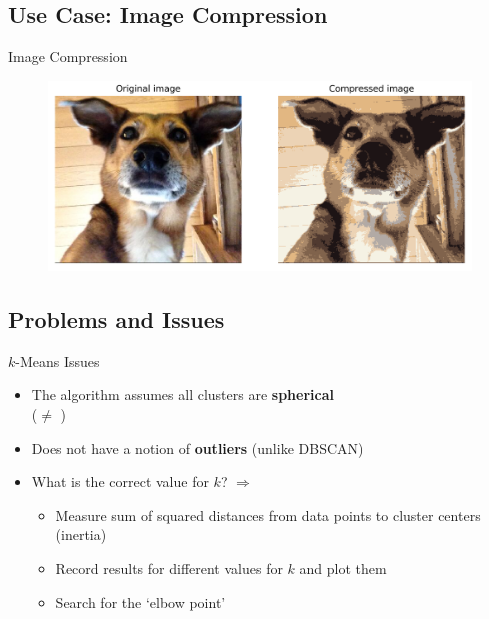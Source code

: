 \subsection{Use Case: Image Compression}

\begin{frame}{Image Compression}{}
	\begin{figure}
		\centering
		\includegraphics[scale=0.3]{12_clustering/02_img/image_compression}
	\end{figure}
\end{frame}


\subsection{Problems and Issues}

\begin{frame}{$k$-Means Issues}{}
	\begin{itemize}
		\item The algorithm assumes all clusters are \textbf{spherical} \\
			($\ne$ )
		\item Does not have a notion of \textbf{outliers} (unlike DBSCAN)
		\item What is the correct value for $k$? $\Rightarrow$ 
		\begin{itemize}
			\item Measure sum of squared distances from data points to cluster centers (inertia)
			\item Record results for different values for $k$ and plot them
			\item Search for the `elbow point'
		\end{itemize}
	\end{itemize}
\end{frame}


